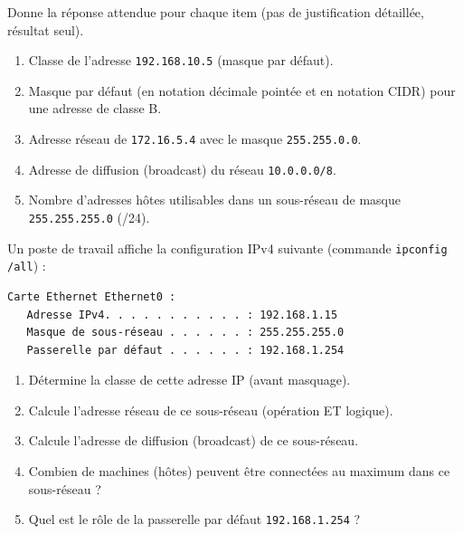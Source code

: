 \documentclass[11pt]{article}
\newcounter{popsec}
\newcounter{popsub}
\newcommand{\courssub}[1]{%
  \stepcounter{popsub}%
  \par\vspace{9pt}\noindent{\popxbold\fontsize{11.5}{13}\selectfont\color{popink}{\color{poporange}\thepopsec.\thepopsub}\hspace{6pt}#1}\par\nopagebreak\vspace{4pt}
}
\begin{document}
\begin{exercice}
Donne la réponse attendue pour chaque item (pas de justification détaillée, résultat seul).

\begin{enumerate}
    \item Classe de l'adresse \texttt{192.168.10.5} (masque par défaut).
    \item Masque par défaut (en notation décimale pointée et en notation CIDR) pour une adresse de classe B.
    \item Adresse réseau de \texttt{172.16.5.4} avec le masque \texttt{255.255.0.0}.
    \item Adresse de diffusion (broadcast) du réseau \texttt{10.0.0.0/8}.
    \item Nombre d'adresses hôtes utilisables dans un sous-réseau de masque \texttt{255.255.255.0} (/24).
\end{enumerate}
\end{exercice}

\courssub{Je m'entraîne}

\begin{exercice}
Un poste de travail affiche la configuration IPv4 suivante (commande \texttt{ipconfig /all}) :
\begin{lstlisting}[language=bash]
Carte Ethernet Ethernet0 :
   Adresse IPv4. . . . . . . . . . . : 192.168.1.15
   Masque de sous-réseau . . . . . . : 255.255.255.0
   Passerelle par défaut . . . . . . : 192.168.1.254
\end{lstlisting}
\begin{enumerate}
    \item Détermine la classe de cette adresse IP (avant masquage).
    \item Calcule l'adresse réseau de ce sous-réseau (opération ET logique).
    \item Calcule l'adresse de diffusion (broadcast) de ce sous-réseau.
    \item Combien de machines (hôtes) peuvent être connectées au maximum dans ce sous-réseau ?
    \item Quel est le rôle de la passerelle par défaut \texttt{192.168.1.254} ?
\end{enumerate}
\end{exercice}
\end{document}
